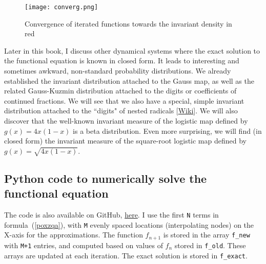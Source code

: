 \documentclass[oneside,10pt]{book}
\begin{document}
\begin{figure}[H]
\centering
\texttt{[image: converg.png]}  %
\caption{Convergence of iterated functions towards the invariant density in red}
\label{fig:diagcvg}
\end{figure}

Later in this book, I discuss other dynamical systems where the exact solution to the functional equation is known in closed form. It leads to interesting and sometimes awkward,
 non-standard probability distributions. We already established the invariant distribution attached to the Gauss map, as well as the
 related \textcolor{index}{Gauss-Kuzmin distribution}  attached to the digits or coefficients of continued fractions.  We will see that we also have a special, simple invariant distribution attached
 to the ``digits" of \textcolor{index}{nested radicals} [\href{https://en.wikipedia.org/wiki/Nested_radical}{Wiki}]. We will also discover that the well-known invariant measure of the 
\textcolor{index}{logistic map} defined by $g(x)=4x(1-x)$ is 
 a \textcolor{index}{beta distribution}. Even more surprising, we will find (in closed form) the invariant measure of the square-root logistic map
 defined by $g(x) =\sqrt{4x(1-x)}$.

\subsection{Python code to numerically solve the functional equation}\label{pawqsx}

The code is also available on GitHub, \href{https://github.com/VincentGranville/Stochastic-Processes/blob/master/chaos_solveFunctional.py}{here}. I use the first \texttt{N} terms in formula~(\ref{poxzqa}), with \texttt{M} evenly spaced locations (interpolating nodes) on the X-axis for the
 approximations. The function $f_{n+1}$ is stored in the array \texttt{f\_new} with \texttt{M+1} entries, and computed based on values of
 $f_{n}$ stored in \texttt{f\_old}. These arrays are updated at each iteration. The exact solution is stored in \texttt{f\_exact}.
\vspace{1ex}
\end{document}
